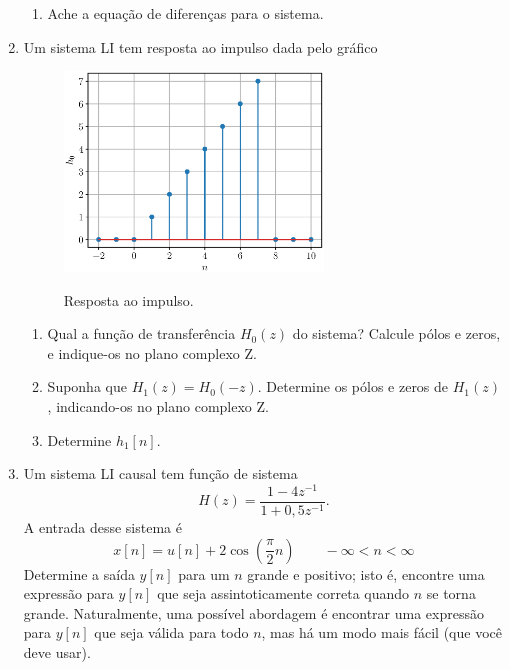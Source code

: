\documentclass[a4paper,10pt]{article}
\begin{document}
\begin{enumerate}
\begin{enumerate}
			\item Ache a equação de diferenças para o sistema.
		\end{enumerate}
	\item Um sistema LI tem resposta ao impulso dada pelo gráfico
		\begin{figure}[h]
			\centering
			\includegraphics[width=0.65\textwidth]{figs/h0}
			\label{fig:h0}
			\caption{Resposta ao impulso.}
		\end{figure}
		\begin{enumerate}
			\item Qual a função de transferência $H_0(z)$ do sistema? Calcule pólos e zeros, e indique-os no plano complexo Z.
			\item Suponha que $H_1(z) = H_0(-z)$. Determine os pólos e zeros de $H_1(z)$, indicando-os no plano complexo Z.
			\item Determine $h_1[n]$.
	        \end{enumerate}
	\item Um sistema LI causal tem função de sistema
		\begin{equation*}
			H(z) = \frac{1-4z^{-1}}{1+0,5z^{-1}}.
		\end{equation*}
		A entrada desse sistema é
		\begin{equation*}
			x[n] = u[n] + 2\cos\left (\frac{\pi}{2}n\right )\qquad -\infty< n < \infty
		\end{equation*}
		Determine a saída $y[n]$ para um $n$ grande e positivo; isto é, encontre uma expressão para $y[n]$ que seja assintoticamente correta quando $n$ se torna grande. Naturalmente, uma possível abordagem é encontrar uma expressão para $y[n]$ que seja válida para todo $n$, mas há um modo mais fácil (que você deve usar).
	

\end{enumerate}
\end{document}
